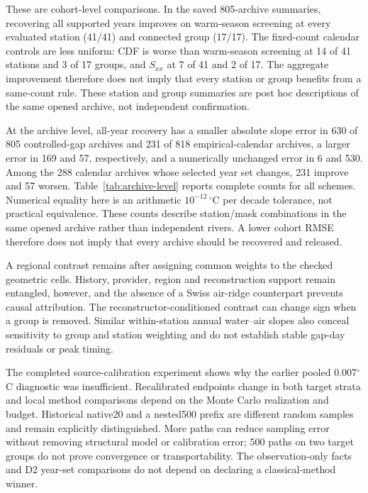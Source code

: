 \documentclass[draft,linenumbers]{agujournal2025}
\makeatletter
\newcommand{\siTableAlias}[2]{%
  \begingroup
  \def\@currentlabel{#2}%
  \label{#1}%
  \endgroup
}
\makeatother
\begin{document}
These are cohort-level comparisons. In the saved 805-archive summaries, recovering all supported years improves on warm-season screening at every evaluated station (41/41) and connected group (17/17). The fixed-count calendar controls are less uniform: CDF is worse than warm-season screening at 14 of 41 stations and 3 of 17 groups, and $S_{xx}$ at 7 of 41 and 2 of 17. The aggregate improvement therefore does not imply that every station or group benefits from a same-count rule. These station and group summaries are post hoc descriptions of the same opened archive, not independent confirmation.

At the archive level, all-year recovery has a smaller absolute slope error in 630 of 805 controlled-gap archives and 231 of 818 empirical-calendar archives, a larger error in 169 and 57, respectively, and a numerically unchanged error in 6 and 530. Among the 288 calendar archives whose selected year set changes, 231 improve and 57 worsen. \siTableAlias{tab:archive-level}{S68}Table~\ref{tab:archive-level} reports complete counts for all schemes. Numerical equality here is an arithmetic $10^{-12}\,^{\circ}\mathrm{C}$ per decade tolerance, not practical equivalence. These counts describe station/mask combinations in the same opened archive rather than independent rivers. A lower cohort RMSE therefore does not imply that every archive should be recovered and released.

A regional contrast remains after assigning common weights to the checked geometric cells. History, provider, region and reconstruction support remain entangled, however, and the absence of a Swiss air-ridge counterpart prevents causal attribution. The reconstructor-conditioned contrast can change sign when a group is removed. Similar within-station annual water--air slopes also conceal sensitivity to group and station weighting and do not establish stable gap-day residuals or peak timing.

The completed source-calibration experiment shows why the earlier pooled 0.007$^{\circ}$C diagnostic was insufficient. Recalibrated endpoints change in both target strata and local method comparisons depend on the Monte Carlo realization and budget. Historical native20 and a nested500 prefix are different random samples and remain explicitly distinguished. More paths can reduce sampling error without removing structural model or calibration error; 500 paths on two target groups do not prove convergence or transportability. The observation-only facts and D2 year-set comparisons do not depend on declaring a classical-method winner.
\end{document}
